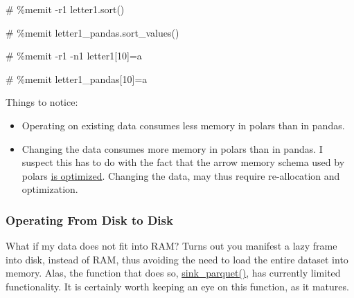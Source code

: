 \documentclass[
  letterpaper,
  DIV=11,
  numbers=noendperiod]{scrartcl}
\newenvironment{Shaded}{\begin{snugshade}}{\end{snugshade}}
\newcommand{\CommentTok}[1]{\textcolor[rgb]{0.37,0.37,0.37}{#1}}
\providecommand{\tightlist}{%
  \setlength{\itemsep}{0pt}\setlength{\parskip}{0pt}}\usepackage{longtable,booktabs,array}
\begin{document}
\begin{Shaded}
\begin{Highlighting}[]
\CommentTok{\# \%memit {-}r1 letter1.sort()}
\end{Highlighting}
\end{Shaded}

\begin{Shaded}
\begin{Highlighting}[]
\CommentTok{\# \%memit letter1\_pandas.sort\_values()}
\end{Highlighting}
\end{Shaded}

\begin{Shaded}
\begin{Highlighting}[]
\CommentTok{\# \%memit {-}r1 {-}n1 letter1[10]=\textquotesingle{}a\textquotesingle{}}
\end{Highlighting}
\end{Shaded}

\begin{Shaded}
\begin{Highlighting}[]
\CommentTok{\# \%memit letter1\_pandas[10]=\textquotesingle{}a\textquotesingle{}}
\end{Highlighting}
\end{Shaded}

Things to notice:

\begin{itemize}
\tightlist
\item
  Operating on existing data consumes less memory in polars than in
  pandas.
\item
  Changing the data consumes more memory in polars than in pandas. I
  suspect this has to do with the fact that the arrow memory schema used
  by polars
  \href{https://pola-rs.github.io/polars-book/user-guide/performance/strings.html}{is
  optimized}. Changing the data, may thus require re-allocation and
  optimization.
\end{itemize}

\hypertarget{operating-from-disk-to-disk}{%
\subsubsection{Operating From Disk to
Disk}\label{operating-from-disk-to-disk}}

What if my data does not fit into RAM? Turns out you manifest a lazy
frame into disk, instead of RAM, thus avoiding the need to load the
entire dataset into memory. Alas, the function that does so,
\href{https://pola-rs.github.io/polars/py-polars/html/reference/lazyframe/api/polars.LazyFrame.sink_parquet.html}{sink\_parquet()},
has currently limited functionality. It is certainly worth keeping an
eye on this function, as it matures.
\end{document}
